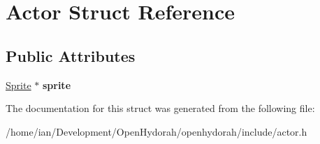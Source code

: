 \hypertarget{structActor}{\section{Actor Struct Reference}
\label{structActor}
}
\subsection*{Public Attributes}
\begin{DoxyCompactItemize}
\item 
\hypertarget{structActor_aaab7c2e1e3187458b1b1f4d678c69eab}{\hyperlink{structSSprite}{Sprite} $\ast$ {\bfseries sprite}}\label{structActor_aaab7c2e1e3187458b1b1f4d678c69eab}

\end{DoxyCompactItemize}


The documentation for this struct was generated from the following file\-:\begin{DoxyCompactItemize}
\item 
/home/ian/\-Development/\-Open\-Hydorah/openhydorah/include/actor.\-h\end{DoxyCompactItemize}
